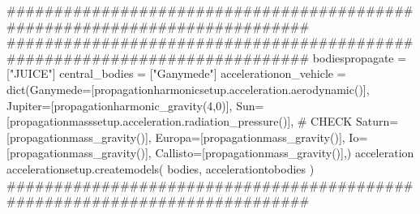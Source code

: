 {}###########################################################################\markdownRendererInterblockSeparator
{}
\markdownRendererSectionEnd \markdownRendererSectionBegin
{}\markdownRendererInterblockSeparator
{}###########################################################################\markdownRendererInterblockSeparator
{}
\markdownRendererSectionEnd \markdownRendererSectionBegin
{}\markdownRendererInterblockSeparator
{}bodiespropagate = ["JUICE"] central_bodies = ["Ganymede"]\markdownRendererInterblockSeparator
{}
\markdownRendererSectionEnd \markdownRendererSectionBegin
{}\markdownRendererInterblockSeparator
{}accelerationon_vehicle = dict(Ganymede=[propagationharmonicsetup.acceleration.aerodynamic()], Jupiter=[propagationharmonic_gravity(4,0)], Sun=[propagationmasssetup.acceleration.radiation_pressure()], # CHECK Saturn=[propagationmass_gravity()], Europa=[propagationmass_gravity()], Io=[propagationmass_gravity()], Callisto=[propagationmass_gravity()],)\markdownRendererInterblockSeparator
{}
\markdownRendererSectionEnd \markdownRendererSectionBegin
{}\markdownRendererInterblockSeparator
{}acceleration\markdownRendererInterblockSeparator
{}
\markdownRendererSectionEnd \markdownRendererSectionBegin
{}\markdownRendererInterblockSeparator
{}accelerationsetup.createmodels( bodies, accelerationtobodies )\markdownRendererInterblockSeparator
{}###########################################################################\markdownRendererInterblockSeparator
